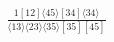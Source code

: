 \documentclass[varwidth, border=5pt]{standalone}
\begin{document}
\begin{my}
$\begin{gathered}
\scriptscriptstyle\frac{1[12]⟨45⟩[34]⟨34⟩}{⟨13⟩⟨23⟩⟨35⟩[35][45]}
\end{gathered}$
\end{my}
\end{document}

